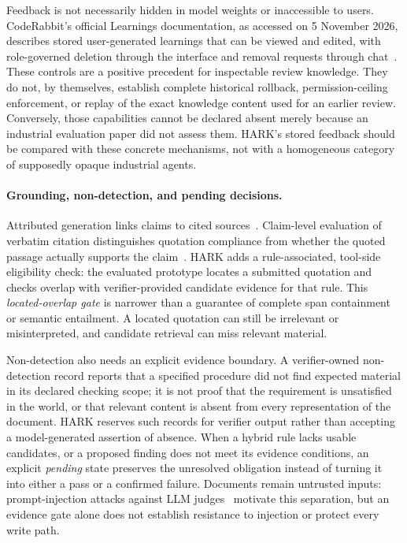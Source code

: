 \documentclass[computers,article,submit,moreauthors]{Definitions/mdpi}
\begin{document}
Feedback is not necessarily hidden in model weights or inaccessible to users. CodeRabbit's official Learnings documentation, as accessed on 5 November 2026, describes stored user-generated learnings that can be viewed and edited, with role-governed deletion through the interface and removal requests through chat~\cite{coderabbitLearnings}. These controls are a positive precedent for inspectable review knowledge. They do not, by themselves, establish complete historical rollback, permission-ceiling enforcement, or replay of the exact knowledge content used for an earlier review. Conversely, those capabilities cannot be declared absent merely because an industrial evaluation paper did not assess them. HARK's stored feedback should be compared with these concrete mechanisms, not with a homogeneous category of supposedly opaque industrial agents.

\paragraph{Grounding, non-detection, and pending decisions.}
Attributed generation links claims to cited sources~\cite{gao2023}. Claim-level evaluation of verbatim citation distinguishes quotation compliance from whether the quoted passage actually supports the claim~\cite{zhang2026cite}. HARK adds a rule-associated, tool-side eligibility check: the evaluated prototype locates a submitted quotation and checks overlap with verifier-provided candidate evidence for that rule. This \emph{located-overlap gate} is narrower than a guarantee of complete span containment or semantic entailment. A located quotation can still be irrelevant or misinterpreted, and candidate retrieval can miss relevant material.

Non-detection also needs an explicit evidence boundary. A verifier-owned non-detection record reports that a specified procedure did not find expected material in its declared checking scope; it is not proof that the requirement is unsatisfied in the world, or that relevant content is absent from every representation of the document. HARK reserves such records for verifier output rather than accepting a model-generated assertion of absence. When a hybrid rule lacks usable candidates, or a proposed finding does not meet its evidence conditions, an explicit \emph{pending} state preserves the unresolved obligation instead of turning it into either a pass or a confirmed failure. Documents remain untrusted inputs: prompt-injection attacks against LLM judges~\cite{shi2024inject} motivate this separation, but an evidence gate alone does not establish resistance to injection or protect every write path.
\end{document}
